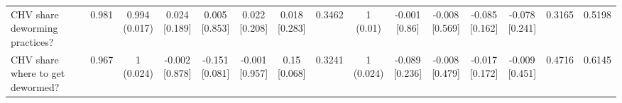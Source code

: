 {\begin{tabular}[t]{lcccccccccccccc}
\hspace{1em}CHV share deworming practices? & 0.981 & \makecell[c]{0.994\\(0.017)} & \makecell[c]{0.024\\{[0.189]}} & \makecell[c]{0.005\\{[0.853]}} & \makecell[c]{0.022\\{[0.208]}} & \makecell[c]{0.018\\{[0.283]}} & 0.3462 & \makecell[c]{1\\(0.01)} & \makecell[c]{-0.001\\{[0.86]}} & \makecell[c]{-0.008\\{[0.569]}} & \makecell[c]{-0.085\\{[0.162]}} & \makecell[c]{-0.078\\{[0.241]}} & 0.3165 & 0.5198\\
\hspace{1em}CHV share where to get dewormed? & 0.967 & \makecell[c]{1\\(0.024)} & \makecell[c]{-0.002\\{[0.878]}} & \makecell[c]{-0.151\\{[0.081]}} & \makecell[c]{-0.001\\{[0.957]}} & \makecell[c]{0.15\\{[0.068]}} & 0.3241 & \makecell[c]{1\\(0.024)} & \makecell[c]{-0.089\\{[0.236]}} & \makecell[c]{-0.008\\{[0.479]}} & \makecell[c]{-0.017\\{[0.172]}} & \makecell[c]{-0.009\\{[0.451]}} & 0.4716 & 0.6145\\
\bottomrule
\end{tabular}}

